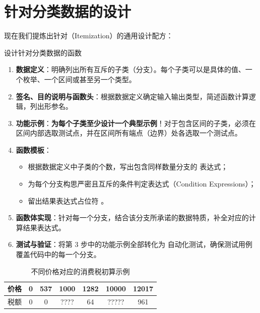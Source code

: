\section{针对分类数据的设计}
\label{sec:4.6_designing_with_itemizations}

现在我们提炼出针对（Itemization）的通用设计配方：

\begin{recipebox}{设计针对分类数据的函数}
\begin{enumerate}
  \item \textbf{数据定义}：明确列出所有互斥的子类（分支）。每个子类可以是具体的值、一个枚举、一个区间或甚至另一个类型。
  \item \textbf{签名、目的说明与函数头}：根据数据定义确定输入输出类型，简述函数计算逻辑，列出形参名。
  \item \textbf{功能示例}：\textbf{为每个子类至少设计一个典型示例}！对于包含区间的子类，必须在区间内部选取测试点，并在区间所有端点（边界）处各选取一个测试点。
  \item \textbf{函数模板}：
    \begin{itemize}
      \item 根据数据定义中子类的个数，写出包含同样数量分支的  表达式；
      \item 为每个分支构思严密且互斥的条件判定表达式（Condition Expressions）；
      \item 留出结果表达式占位符 。
    \end{itemize}
  \item \textbf{函数体实现}：针对每一个分支，结合该分支所承诺的数据特质，补全对应的计算结果表达式。
  \item \textbf{测试与验证}：将第 3 步中的功能示例全部转化为  自动化测试，确保测试用例覆盖代码中的每一个分支。
\end{enumerate}
\end{recipebox}

\begin{table}[htbp]
  \centering
  \caption{不同价格对应的消费税初算示例}
  \label{tab:tax_examples}
  \small
  \setlength{\tabcolsep}{6pt}
  \begin{tabular}{lcccccc}
    \hline
    价格 & 0 & 537 & 1000 & 1282 & 10000 & 12017 \\
    \hline
    税额 & 0 & 0 & ???? & 64 & ????? & 961 \\
    \hline
  \end{tabular}
\end{table}

